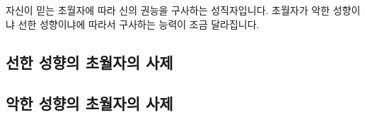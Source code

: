 \documentclass{report}
\begin{document}
	
	자신이 믿는 초월자에 따라 신의 권능을 구사하는 성직자입니다. 초월자가 악한 성향이냐 선한 성향이냐에 따라서 구사하는 능력이 조금 달라집니다.
	
	\subsection{선한 성향의 초월자의 사제}
		
		
	\subsection{악한 성향의 초월자의 사제}
		
	
\end{document}
